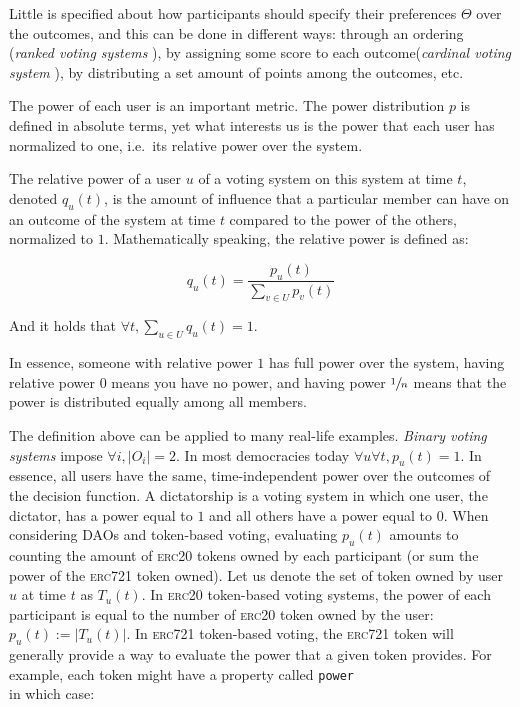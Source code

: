 Little is specified about how participants should specify their preferences $\Theta$ over the outcomes, and this can be done in different ways: through an ordering (\textit{ranked voting systems}%
), by assigning some score to each outcome(\textit{cardinal voting system}%
), by distributing a set amount of points among the outcomes, etc.

The power of each user is an important metric.
The power distribution $p$ is defined in absolute terms, yet what interests us is the power that each user has normalized to one, i.e.\ its relative power over the system.

\begin{definition}
  The relative power of a user $u$ of a voting system on this system at time $t$, denoted $q_u(t)$, is the amount of influence that a particular member can have on an outcome of the system at time $t$ compared to the power of the others, normalized to $1$.
  Mathematically speaking, the relative power is defined as:

  \begin{equation}
    \label{eqn:relative_power}
    q_u(t) = \frac{p_u(t)}{\sum_{v\in U}p_v(t)}
  \end{equation}
\end{definition}

And it holds that $\forall t,\sum_{u\in U} q_u(t) = 1$.

In essence, someone with relative power $1$ has full power over the system, having relative power $0$ means you have no power, and having power $\sfrac{1}{n}$ means that the power is distributed equally among all members.

The definition above can be applied to many real-life examples.
\textit{Binary voting systems} impose $\forall i, |O_i| = 2$.
In most democracies today $\forall u\forall t, p_u(t) = 1$.
In essence, all users have the same, time-independent power over the outcomes of the decision function.
A dictatorship is a voting system in which one user, the dictator, has a power equal to $1$ and all others have a power equal to $0$.
When considering DAOs and token-based voting, evaluating $p_u(t)$ amounts to counting the amount of \textsc{erc20} tokens owned by each participant (or sum the power of the \textsc{erc721} token owned).
Let us denote the set of token owned by user $u$ at time $t$ as $T_u(t)$.
In \textsc{erc20} token-based voting systems, the power of each participant is equal to the number of \textsc{erc20} token owned by the user: $p_u(t) := |T_u(t)|$.
In \textsc{erc721} token-based voting, the \textsc{erc721} token will generally provide a way to evaluate the power that a given token provides.
For example, each token might have a property called \texttt{power}\\in which case:

